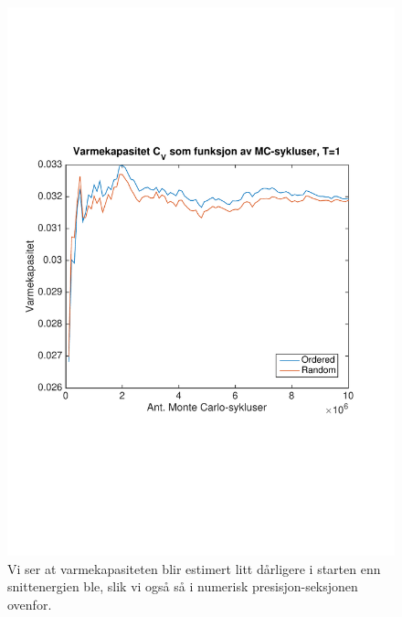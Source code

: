 \documentclass[norsk, 10pt]{article}
\begin{document}
\begin{figure}[H]
\centering
\includegraphics[scale = 0.6, trim = 1cm 8cm 1cm 8cm]{b_varmekap_MC_L2_T1.pdf}
\caption{Vi ser at varmekapasiteten blir estimert litt dårligere i starten enn snittenergien ble, slik vi også så i numerisk presisjon-seksjonen ovenfor.}
\label{fig:varmekapT1}
\end{figure}
\end{document}
